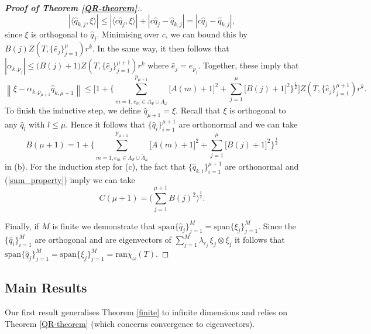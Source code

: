 \documentclass[a4paper,10pt]{article}
\begin{document}
\begin{proof}[\textbf{Proof of Theorem \ref{QR-theorem}}:]
$$
\left|\langle \hat q_{k,j},\xi\rangle\right|\leq\left|\langle c\hat q_{j},\xi\rangle\right|+\left|c\hat q_{j}-\hat q_{k,j}\right|=\left|c\hat q_{j}-\hat q_{k,j}\right|,
$$
since $\xi$ is orthogonal to $\hat q_j$. Minimising over $c$, we can bound this by $B(j)Z(T,\{\hat e_j\}_{j=1}^{\mu}) r^k$. In the same way, it then follows that $|\alpha_{k,p_{j}}|\leq\big(B(j)+1\big)Z(T,\{\hat e_j\}_{j=1}^{\mu+1})r^k$ where $\hat e_j=e_{p_j}$. Together, these imply that
$$
\left\|\xi-\alpha_{k,p_{\mu+1}}\hat q_{k,\mu+1}\right\|\leq \Big[1+\Big\{\sum_{m=1,e_m\in\Lambda_{\Psi}\cup\tilde \Lambda_{\omega}}^{p_{\mu+1}} \big[A(m)+1\big]^2 +\sum_{j=1}^{\mu} \big[B(j)+1\big]^2\Big\}^{\frac{1}{2}}\Big]Z(T,\{\hat e_j\}_{j=1}^{\mu+1})r^{k}.
$$
To finish the inductive step, we define $\hat q_{\mu+1}=\xi$. Recall that $\xi$ is orthogonal to any $\hat q_{l}$ with $l\leq \mu$. Hence it follows that $\{\hat q_i\}_{i=1}^{\mu+1}$ are orthonormal and we can take
$$
B(\mu+1)=1+\Big\{\sum_{m=1,e_m\in\Lambda_{\Psi}\cup\tilde \Lambda_{\omega}}^{p_{\mu+1}} \big[A(m)+1\big]^2 +\sum_{j=1}^{\mu} \big[B(j)+1\big]^2\Big\}^{\frac{1}{2}}
$$
in (b). For the induction step for (c), the fact that $\{\hat q_{k,i}\}_{i=1}^{\mu+1}$ are orthonormal and (\ref{sum_property}) imply we can take
$$
C(\mu+1)=\Big(\sum_{j=1}^{\mu+1}B(j)^2\Big)^{\frac{1}{2}}.
$$

Finally, if $M$ is finite we demonstrate that $\mathrm{span}\{\hat q_j\}_{j = 1}^M = \mathrm{span}\{\xi_j\}_{j=1}^M.$ Since the $\{\hat q_i\}_{i=1}^M$ are orthogonal and are eigenvectors of $\sum_{j=1}^M \lambda_{c_j} \,\xi_j\otimes\bar \xi_j$ it follows that $\mathrm{span}\{\hat q_j\}_{j = 1}^M =
\mathrm{span}\{\xi_j\}_{j=1}^M = \mathrm{ran}\chi_{\omega}(T).$
\end{proof}


\subsection{Main Results}
\label{main_res_sectIII}

Our first result generalises Theorem \ref{finite} to infinite dimensions and relies on Theorem \ref{QR-theorem} (which concerns convergence to eigenvectors).
\end{document}
